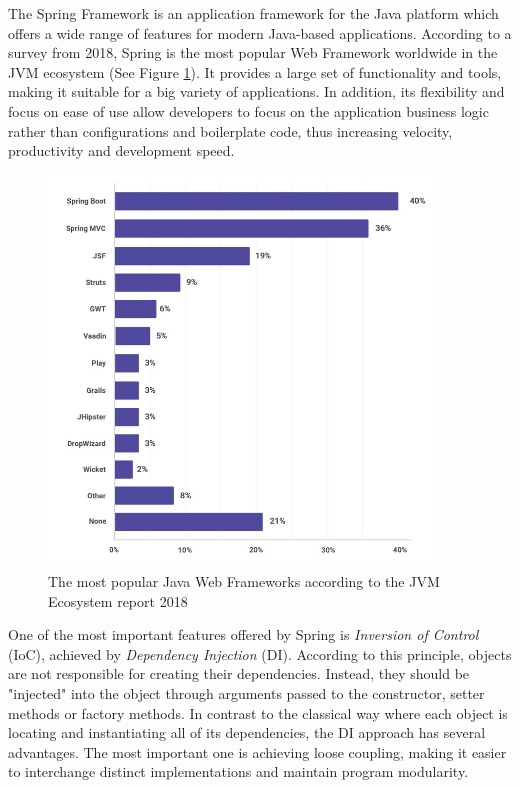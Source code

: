 The Spring Framework is an application framework for the Java platform which offers a wide range of features for modern Java-based applications. According to a survey from 2018, Spring is the most popular Web Framework worldwide in the JVM ecosystem (See Figure \ref{javaWebFrameworksTrendsImg}). It provides a large set of functionality and tools, making it suitable for a big variety of applications. In addition, its flexibility and focus on ease of use allow developers to focus on the application business logic rather than configurations and boilerplate code, thus increasing velocity, productivity and development speed.

\begin{figure}[H]
    \centering
    \includegraphics[width=4in]{images/javaWebFrameworksTrends}
    \caption{The most popular Java Web Frameworks according to the JVM Ecosystem report 2018 \cite{jvmEcosystemReport}}
    \label{javaWebFrameworksTrendsImg}
\end{figure}

One of the most important features offered by Spring is \textit{Inversion of Control} (IoC), achieved by \textit{Dependency Injection} (DI). According to this principle, objects are not responsible for creating their dependencies. Instead, they should be "injected" into the object through arguments passed to the constructor, setter methods or factory methods. In contrast to the classical way where each object is locating and instantiating all of its dependencies, the DI approach has several advantages. The most important one is achieving loose coupling, making it easier to interchange distinct implementations and maintain program modularity.

